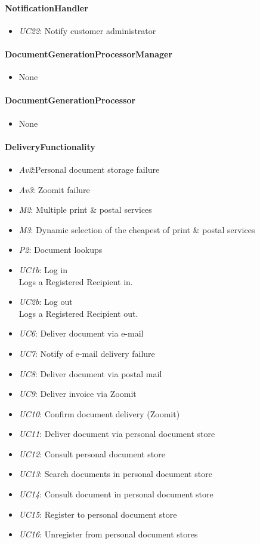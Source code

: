 \documentclass[a4paper,10pt]{article}
\begin{document}
\paragraph{NotificationHandler}
\begin{itemize}
	\item \emph{UC22}: Notify customer administrator
\end{itemize}
\paragraph{DocumentGenerationProcessorManager}
\begin{itemize}
	\item None
\end{itemize}
\paragraph{DocumentGenerationProcessor}
\begin{itemize}
	\item None
\end{itemize}
\paragraph{DeliveryFunctionality}
\begin{itemize}
	\item \emph{Av2}:Personal document storage failure
	\item \emph{Av3}: Zoomit failure
	\item \emph{M2}: Multiple print \& postal services
	\item \emph{M3}: Dynamic selection of the cheapest of print \& postal services
	\item \emph{P2}: Document lookups
	\item \emph{UC1b}: Log in\\ Logs a Registered Recipient in.
    \item \emph{UC2b}: Log out\\ Logs a Registered Recipient out.
	\item \emph{UC6}: Deliver document via e-mail
 	\item \emph{UC7}: Notify of e-mail delivery failure
 	\item \emph{UC8}: Deliver document via postal mail
 	\item \emph{UC9}: Deliver invoice via Zoomit
 	\item \emph{UC10}: Confirm document delivery (Zoomit)
	\item \emph{UC11}: Deliver document via personal document store
	\item \emph{UC12}: Consult personal document store
	\item \emph{UC13}: Search documents in personal document store
	\item \emph{UC14}: Consult document  in personal document store
	\item \emph{UC15}: Register to personal document store
	\item \emph{UC16}: Unregister from personal document stores
\end{itemize}
\end{document}

